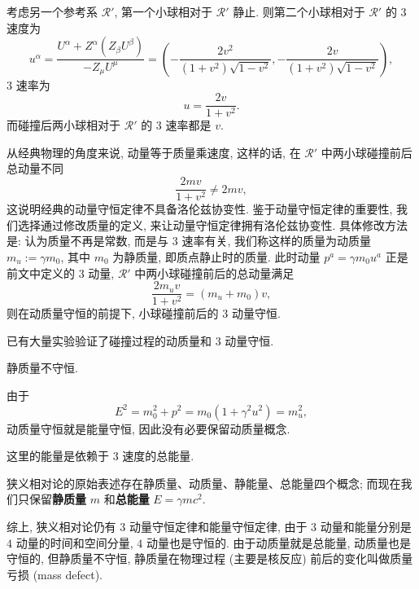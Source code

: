考虑另一个参考系 $ \mathcal{R}' $, 第一个小球相对于 $ \mathcal{R}' $ 静止. 则第二个小球相对于 $ \mathcal{R}' $ 的 $ 3 $ 速度为
\[ u^\alpha=\frac{U^\alpha+Z^\alpha(Z_\beta U^\beta)}{-Z_\mu U^\mu}=\left( -\frac{2v^2}{(1+v^2)\sqrt{1-v^2}},-\frac{2v}{(1+v^2)\sqrt{1-v^2}} \right), \]
$ 3 $ 速率为
\[ u=\frac{2v}{1+v^2}. \]
而碰撞后两小球相对于 $ \mathcal{R}' $ 的 $ 3 $ 速率都是 $ v $.

从经典物理的角度来说, 动量等于质量乘速度, 这样的话, 在 $ \mathcal{R}' $ 中两小球碰撞前后总动量不同
\[ \frac{2mv}{1+v^2} \neq 2mv, \]
这说明经典的动量守恒定律不具备洛伦兹协变性. 鉴于动量守恒定律的重要性, 我们选择通过修改质量的定义, 来让动量守恒定律拥有洛伦兹协变性. 具体修改方法是: 认为质量不再是常数, 而是与 $ 3 $ 速率有关, 我们称这样的质量为动质量 $ m_u:=\gamma m_0$, 其中 $ m_0 $ 为静质量, 即质点静止时的质量. 此时动量 $ p^a=\gamma m_0 u^a $ 正是前文中定义的 $ 3 $ 动量, $ \mathcal{R}' $
中两小球碰撞前后的总动量满足
\[ \frac{2m_uv}{1+v^2}=(m_u+m_0)v, \]
则在动质量守恒的前提下, 小球碰撞前后的 $ 3 $ 动量守恒. 
\begin{remark}
    已有大量实验验证了碰撞过程的动质量和 $ 3 $ 动量守恒.
\end{remark}
\begin{remark}
    静质量不守恒.
\end{remark}
由于 
\[ E^2=m_0^2+p^2=m_0(1+\gamma^2u^2)=m_u^2, \]
动质量守恒就是能量守恒, 因此没有必要保留动质量概念.
\begin{remark}
    这里的能量是依赖于 $ 3 $ 速度的总能量.
\end{remark}

狭义相对论的原始表述存在静质量、动质量、静能量、总能量四个概念; 而现在我们只保留{\bf 静质量} $ m $ 和{\bf 总能量} $ E=\gamma m c^2 $\cite[上册 155 页]{梁灿彬2000微分几何入门与广义相对论}.

综上, 狭义相对论仍有 $ 3 $ 动量守恒定律和能量守恒定律, 由于 $ 3 $ 动量和能量分别是 $ 4 $ 动量的时间和空间分量, $ 4 $ 动量也是守恒的. 由于动质量就是总能量, 动质量也是守恒的, 但静质量不守恒, 静质量在物理过程 (主要是核反应) 前后的变化叫做质量亏损 (mass defect).
